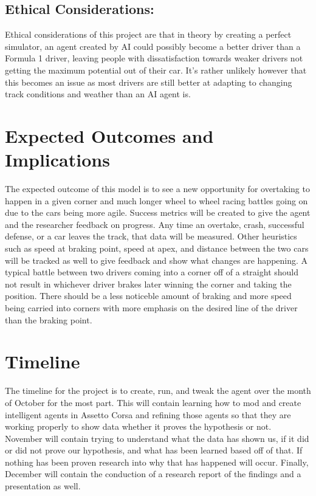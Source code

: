 \documentclass[11pt]{article} %
\begin{document}
\subsection {Ethical Considerations:} Ethical considerations of this project are that in theory by creating a perfect simulator, an agent created by AI could possibly become a better driver than a Formula 1 driver, leaving people with dissatisfaction towards weaker drivers not getting the maximum potential out of their car. It's rather unlikely however that this becomes an issue as most drivers are still better at adapting to changing track conditions and weather than an AI agent is.


\section {Expected Outcomes and Implications}

The expected outcome of this model is to see a new opportunity for overtaking to happen in a given corner and much longer wheel to wheel racing battles going on due to the cars being more agile. Success metrics will be created to give the agent and the researcher feedback on progress. Any time an overtake, crash, successful defense, or a car leaves the track, that data will be measured. Other heuristics such as speed at braking point, speed at apex, and distance between the two cars will be tracked as well to give feedback and show what changes are happening. A typical battle between two drivers coming into a corner off of a straight should not result in whichever driver brakes later winning the corner and taking the position. There should be a less noticeble amount of braking and more speed being carried into corners with more emphasis on the desired line of the driver than the braking point. 

\section {Timeline}

The timeline for the project is to create, run, and tweak the agent over the month of October for the most part. This will contain learning how to mod and create intelligent agents in Assetto Corsa and refining those agents so that they are working properly to show data whether it proves the hypothesis or not.  November will contain trying to understand what the data has shown us, if it did or did not prove our hypothesis, and what has been learned based off of that. If nothing has been proven research into why that has happened will occur. Finally, December will contain the conduction of a research report of the findings and a presentation as well.  
\end{document}
